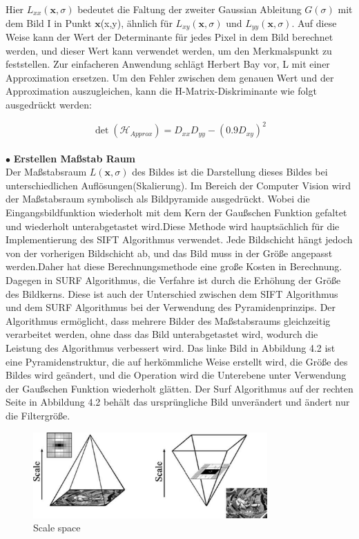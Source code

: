 Hier $L_{xx}(\textbf{x},\sigma)$ bedeutet die Faltung der zweiter Gaussian Ableitung $G(\sigma)$ mit dem Bild I in Punkt $\textbf{x}$(x,y), ähnlich für $L_{xy}(\textbf{x},\sigma)$ und $L_{yy}(\textbf{x},\sigma)$. Auf diese Weise kann der Wert der Determinante für jedes Pixel in dem Bild berechnet werden, und dieser Wert kann verwendet werden, um den Merkmalspunkt zu feststellen.
Zur einfacheren Anwendung schlägt Herbert Bay\cite{Surf} vor, L mit einer Approximation ersetzen. Um den Fehler zwischen dem genauen Wert und der Approximation auszugleichen, kann die H-Matrix-Diskriminante wie folgt ausgedrückt werden:

\begin{equation}
   \det(\mathcal{H}_{Approx}) = D_{xx}D_{yy} - (0.9D_{xy})^2  
\end{equation}
\\
$\bullet$ \textbf{Erstellen Maßstab Raum}\\
Der Maßstabsraum $L(\textbf{x},\sigma)$ des Bildes ist die Darstellung dieses Bildes bei unterschiedlichen Auflösungen(Skalierung). Im Bereich der Computer Vision wird der Maßstabsraum symbolisch als Bildpyramide ausgedrückt. Wobei die Eingangsbildfunktion wiederholt mit dem Kern der Gaußschen Funktion gefaltet und wiederholt unterabgetastet wird.Diese Methode wird hauptsächlich für die Implementierung des SIFT Algorithmus verwendet. Jede Bildschicht hängt jedoch von der vorherigen Bildschicht ab, und das Bild muss in der Größe angepasst werden.Daher hat diese Berechnungsmethode eine große Kosten in Berechnung. Dagegen in SURF Algorithmus, die Verfahre ist durch die Erhöhung der Größe des Bildkerns. Diese ist auch der Unterschied zwischen dem SIFT Algorithmus und dem SURF Algorithmus bei der Verwendung des Pyramidenprinzips.
Der Algorithmus ermöglicht, dass mehrere Bilder des Maßstabsraums gleichzeitig verarbeitet werden, ohne dass das Bild unterabgetastet wird, wodurch die Leistung des Algorithmus verbessert wird. Das linke Bild in Abbildung 4.2 ist eine Pyramidenstruktur, die auf herkömmliche Weise erstellt wird, die Größe des Bildes wird geändert, und die Operation wird die Unterebene  unter Verwendung der Gaußschen Funktion wiederholt glätten. Der Surf Algorithmus auf der rechten Seite in Abbildung 4.2 behält das ursprüngliche Bild unverändert und ändert nur die Filtergröße.

\begin{figure}[htb]
 \centering 
 \includegraphics[keepaspectratio,width=0.8\textwidth]{images/4_ZweiteErfahrung/Pyramidenstruktur.pdf}
 \caption{Scale space}
 \label{fig:Scale space}
\end{figure} 


